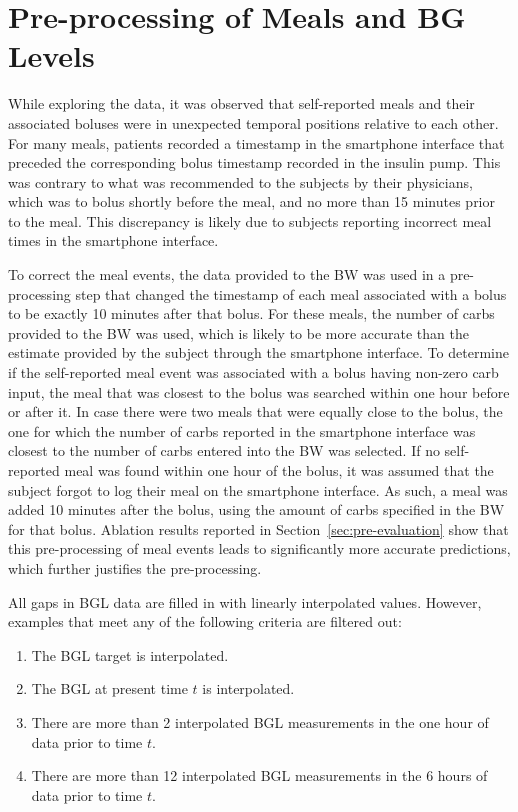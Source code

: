 \section{Pre-processing of Meals and BG Levels}
\label{sec:pre-processing}

While exploring the data, it was observed that self-reported meals and their associated boluses were in unexpected temporal positions relative to each other. For many meals, patients recorded a timestamp in the smartphone interface that preceded the corresponding bolus timestamp recorded in the insulin pump. This was contrary to what was recommended to the subjects by their physicians, which was to bolus shortly before the meal, and no more than 15 minutes prior to the meal. This discrepancy is likely due to subjects reporting incorrect meal times in the smartphone interface.

To correct the meal events, the data provided to the \ac{BW} was used in a pre-processing step that changed the timestamp of each meal associated with a bolus to be exactly 10 minutes after that bolus. For these meals, the number of carbs provided to the \ac{BW} was used, which is likely to be more accurate than the estimate provided by the subject through the smartphone interface. To determine if the self-reported meal event was associated with a bolus having non-zero carb input, the meal that was closest to the bolus was searched within one hour before or after it. In case there were two meals that were equally close to the bolus, the one for which the number of carbs reported in the smartphone interface was closest to the number of carbs entered into the \ac{BW} was selected. If no self-reported meal was found within one hour of the bolus, it was assumed that the subject forgot to log their meal on the smartphone interface. As such, a meal was added 10 minutes after the bolus, using the amount of carbs specified in the \ac{BW} for that bolus. Ablation results reported in Section~\ref{sec:pre-evaluation} show that this pre-processing of meal events leads to significantly more accurate predictions, which further justifies the pre-processing.

All gaps in \ac{BGL} data are filled in with linearly interpolated values. However, examples that meet any of the following criteria are filtered out:
\begin{enumerate}
    \item The \ac{BGL} target is interpolated.
    \item The \ac{BGL} at present time $t$ is interpolated.
    \item There are more than 2 interpolated \ac{BGL} measurements in the one hour of data prior to time $t$.
    \item There are more than 12 interpolated \ac{BGL} measurements in the 6 hours of data prior to time $t$.
\end{enumerate}



